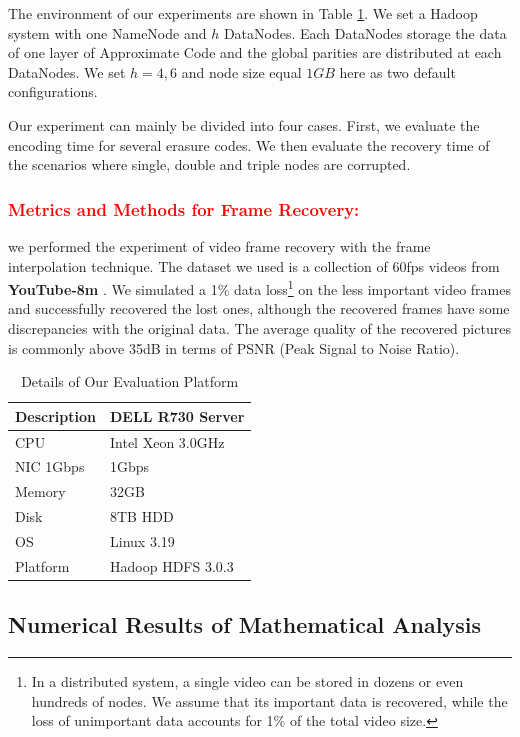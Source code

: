 \documentclass[sigconf]{acmart}
\begin{document}
The environment of our experiments are shown in Table \ref{tab-platform}. We set a Hadoop system with one NameNode and $h$ DataNodes. Each DataNodes storage the data of one layer of Approximate Code and the global parities are distributed at each DataNodes. We set $h=4,6$ and node size equal $1GB$ here as two default configurations. 

Our experiment can mainly be divided into four cases. First, we evaluate the encoding time for several erasure codes. We then evaluate the recovery time of the scenarios where single, double and triple nodes are corrupted.

\subsubsection{\textcolor{red}{Metrics and Methods for Frame Recovery: }}
we performed the experiment of video frame recovery with the frame interpolation technique. The dataset we used is a collection of 60fps videos from \textbf{YouTube-8m} \cite{youtube8m}. We simulated a 1\% data loss\footnote{In a distributed system, a single video can be stored in dozens or even hundreds of nodes. We assume that its important data is recovered, while the loss of unimportant data accounts for 1\% of the total video size.} on the less important video frames and successfully recovered the lost ones, although the recovered frames have some discrepancies with the original data. The average quality of the recovered pictures is commonly above 35dB in terms of PSNR (Peak Signal to Noise Ratio).

\begin{table}[!ht]
\begin{tabular}{|l|l|}
\hline
Description & DELL R730 Server \\ \hline
CPU & Intel Xeon 3.0GHz \\ \hline
NIC 1Gbps & 1Gbps \\ \hline
Memory & 32GB \\ \hline
Disk & 8TB HDD \\ \hline
OS & Linux 3.19 \\ \hline
Platform & Hadoop HDFS 3.0.3 \\ \hline
\end{tabular}
\caption{Details of Our Evaluation Platform}\label{tab-platform}
\end{table}

\subsection{Numerical Results of Mathematical Analysis}
\end{document}
